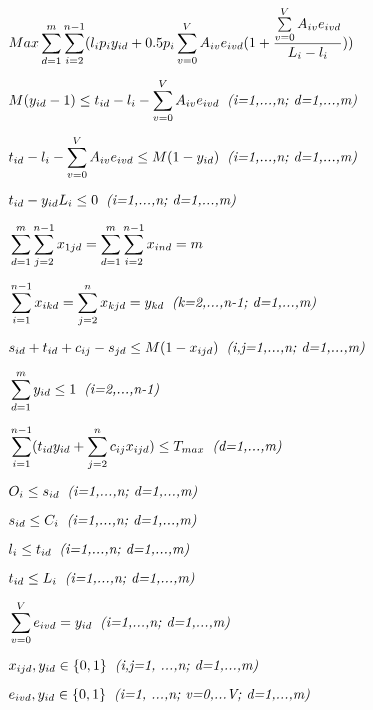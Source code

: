 \documentclass[final,5p,times,twocolumn]{elsarticle}
\begin{document}
\begin{align}
&Max \sum\limits_{d=1}^m\sum\limits_{i=2}^{n-1} (l_{i} p_{i} y_{id} + 0.5 p_{i}\sum\limits_{v=0}^V A_{iv} e_{ivd}(1 + \dfrac{\sum\limits_{v=0}^V A_{iv} e_{ivd}}{L_{i} - l_{i}})) \\[0.2cm] 
&M(y_{id} - 1) \leq t_{id} - l_{i} - \sum\limits_{v=0}^V A_{iv} e_{ivd} \textit{\hspace{0.2cm}(i=1,...,n; d=1,...,m)} \\[0.2cm]
&t_{id} - l_{i} - \sum\limits_{v=0}^V A_{iv} e_{ivd} \leq M(1 - y_{id}) \textit{\hspace{0.2cm}(i=1,...,n; d=1,...,m)}  \\[0.2cm]
&t_{id} - y_{id}L_{i} \leq 0 \textit{\hspace{0.2cm}(i=1,...,n; d=1,...,m)}  \\[0.2cm]
&\sum\limits_{d=1}^m\sum\limits_{j=2}^{n-1}x_{1jd}=\sum\limits_{d=1}^m\sum\limits_{i=2}^{n-1}x_{ind}=m\\[0.2cm]
&\sum\limits_{i=1}^{n-1}x_{ikd}=\sum\limits_{j=2}^{n}x_{kjd}=y_{kd} \textit{\hspace{0.2cm}(k=2,...,n-1; d=1,...,m)}\\[0.2cm]
&s_{id}+t_{id}+c_{ij}-s_{jd}\leq M(1-x_{ijd}) \textit{\hspace{0.2cm}(i,j=1,...,n; d=1,...,m)}\\[0.2cm]
&\sum\limits_{d=1}^{m}y_{id} \leq 1 \textit{\hspace{0.2cm}(i=2,...,n-1)}\\[0.2cm]
&\sum\limits_{i=1}^{n-1}(t_{id}y_{id} + \sum\limits_{j=2}^{n}c_{ij}x_{ijd}) \leq T_{max} \textit{\hspace{0.2cm}(d=1,...,m)}\\[0.2cm]
&O_{i} \leq s_{id} \textit{\hspace{0.2cm}(i=1,...,n; d=1,...,m)}\\[0.2cm]
&s_{id} \leq C_{i} \textit{\hspace{0.2cm}(i=1,...,n; d=1,...,m)}\\[0.2cm]
&l_{i} \leq t_{id} \textit{\hspace{0.2cm}(i=1,...,n; d=1,...,m)}\\[0.2cm]
&t_{id}  \leq L_{i} \textit{\hspace{0.2cm}(i=1,...,n; d=1,...,m)}\\[0.2cm]
&\sum\limits_{v=0}^V e_{ivd} = y_{id} \textit{\hspace{0.2cm}(i=1,...,n; d=1,...,m)}\\[0.2cm]
&x_{ijd}, y_{id} \in \lbrace0,1\rbrace \textit{\hspace{0.2cm}(i,j=1, ...,n; d=1,...,m)}\\[0.2cm]
&e_{ivd}, y_{id} \in \lbrace0,1\rbrace \textit{\hspace{0.2cm}(i=1, ...,n; v=0,...V; d=1,...,m)}
\end{align}
\end{document}

